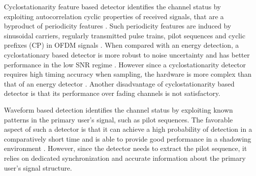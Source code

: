 Cyclostationarity feature based detector identifies the channel status by exploiting autocorrelation cyclic properties of received signals, that are a byproduct of periodicity features \cite{goldsmith2009breaking}. Such periodicity features are induced by  sinusoidal carriers,  regularly transmitted pulse trains, pilot sequences and cyclic prefixes (CP) in OFDM signals \cite{akyildiz2011cooperative, umar2013comparative}.  
When compared with an energy detection, a cyclostationary based detector is more robust to noise uncertainty and has better performance in the low SNR regime \cite{umar2013comparative}. However since a cyclostationarity detector requires high timing accuracy when sampling, the hardware is more complex than that of an energy detector \cite{yucek2009survey}. Another disadvantage of cyclostationarity based detector is that its performance over fading channels is not satisfactory\cite{tandra2007snr}.   

Waveform based detection identifies the channel status by exploiting known patterns in the primary user's signal, such as pilot sequences. The favorable aspect of such a detector is that it can achieve a high probability of detection in a comparatively short time and is able to provide  good performance in a shadowing environment \cite{tang2005some}. However, since the detector needs to extract the pilot sequence, it relies on dedicated synchronization and accurate information about the primary user's signal structure.  



